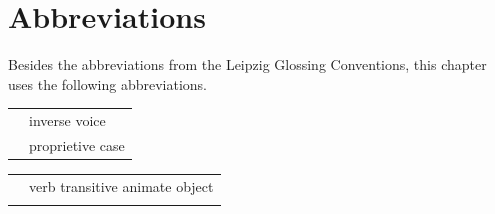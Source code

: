 \documentclass[output=paper,hidelinks]{langscibook}
\begin{document}
\section*{Abbreviations}

Besides the abbreviations from the Leipzig Glossing Conventions, this
chapter uses the following abbreviations.\medskip

\noindent\begin{tabularx}{.45\textwidth}{lQ}
 & inverse voice \\
 & proprietive case \\
\end{tabularx}\begin{tabularx}{.5\textwidth}{lQ}
 & verb transitive animate object \\
\\
\end{tabularx}

  
\sloppy
\printbibliography[heading=subbibliography,notkeyword=this]
\end{document}
